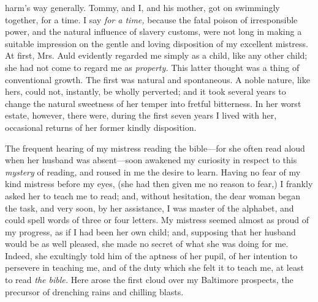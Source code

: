 harm's way generally. Tommy, and I, and his mother, got on swimmingly
together, for a time. I say \emph{for a time,} because the fatal poison
of irresponsible power, and the natural influence of slavery customs,
were not long in making a suitable impression on the gentle and loving
disposition of my excellent mistress. At first, Mrs. Auld evidently
regarded me simply as a child, like any other child; she had not come to
regard me as \emph{property.} This latter thought was a thing of
conventional growth. The first was natural and spontaneous. A noble
nature, like hers, could not, instantly, be wholly perverted; and it
took several years to change the natural sweetness of her
{\protect\hypertarget{145}{}{}}temper into fretful bitterness. In her
worst estate, however, there were, during the first seven years I lived
with her, occasional returns of her former kindly disposition.

The frequent hearing of my mistress reading the bible---for she often
read aloud when her husband was absent---soon awakened my curiosity in
respect to this \emph{mystery} of reading, and roused in me the desire
to learn. Having no fear of my kind mistress before my eyes, (she had
then given me no reason to fear,) I frankly asked her to teach me to
read; and, without hesitation, the dear woman began the task, and very
soon, by her assistance, I was master of the alphabet, and could spell
words of three or four letters. My mistress seemed almost as proud of my
progress, as if I had been her own child; and, supposing that her
husband would be as well pleased, she made no secret of what she was
doing for me. Indeed, she exultingly told him of the aptness of her
pupil, of her intention to persevere in teaching me, and of the duty
which she felt it to teach me, at least to read \emph{the bible.} Here
arose the first cloud over my Baltimore prospects, the precursor of
drenching rains and chilling blasts.


